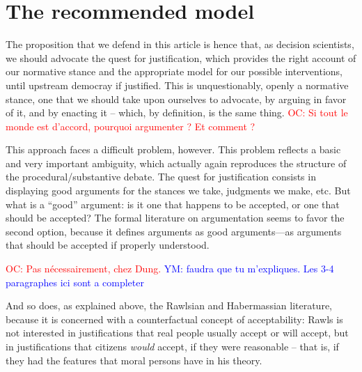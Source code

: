 \documentclass[preprint, french, english, 11pt]{elsarticle}%
\newcommand{\commentYM}[1]{\textcolor{blue}{YM: #1}}
\newcommand{\commentOC}[1]{\textcolor{red}{OC: #1}}
\begin{document}
\section{The recommended model}
The proposition that we defend in this article is hence that, as decision scientists, we should advocate the quest for justification, which provides the right account of our normative stance and the appropriate model for our possible interventions, until upstream democray if justified. This is unquestionably, openly a normative stance, one that we should take upon ourselves to advocate, by arguing in favor of it, and by enacting it -- which, by definition, is the same thing.
\commentOC{Si tout le monde est d’accord, pourquoi argumenter ? Et comment ?}

This approach faces a difficult problem, however. This problem reflects a basic and very important ambiguity, which actually again reproduces the structure of the procedural/substantive debate. The quest for justification consists in displaying good arguments for the stances we take, judgments we make, etc. But what is a ``good'' argument: is it one that happens to be accepted, or one that should be accepted?
The formal literature on argumentation \cite{dung_acceptability_1995,besnard_elements_2008} seems to favor the second option, because it defines arguments as good arguments—as arguments that should be accepted if properly understood. 

\commentOC{Pas nécessairement, chez Dung.}
\commentYM{faudra que tu m'expliques. Les 3-4 paragraphes ici sont a completer}

And so does, as explained above, the Rawlsian and Habermassian literature, because it is concerned with a counterfactual concept of acceptability: Rawls is not interested in justifications that real people usually accept or will accept, but in justifications that citizens \emph{would} accept, if they were reasonable -- that is, if they had the features that moral persons have in his theory. %


 
\end{document}
